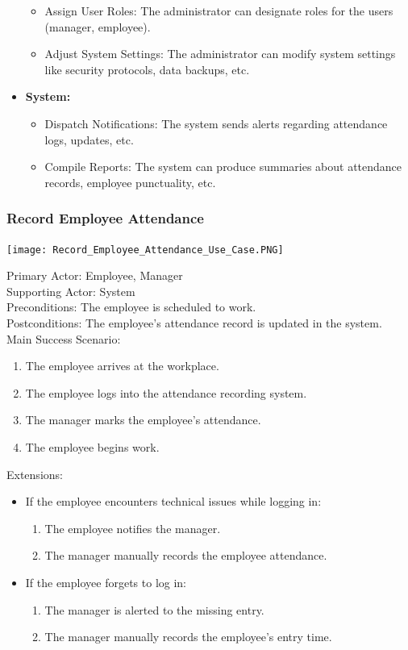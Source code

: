 \documentclass[a4paper, 12pt]{article}
\begin{document}
\begin{itemize}
\begin{itemize}
        \item Assign User Roles: The administrator can designate roles for the users (manager, employee).
        \item Adjust System Settings: The administrator can modify system settings like security protocols, data backups, etc.
    \end{itemize}
    \item \textbf{System:}
    \begin{itemize}
        \item Dispatch Notifications: The system sends alerts regarding attendance logs, updates, etc.
        \item Compile Reports: The system can produce summaries about attendance records, employee punctuality, etc.
    \end{itemize}
\end{itemize}

\subsubsection{Record Employee Attendance}
\begin{center}
\texttt{[image: Record\_Employee\_Attendance\_Use\_Case.PNG]}\par
\end{center}
Primary Actor: Employee, Manager\\
Supporting Actor: System\\
Preconditions: The employee is scheduled to work.\\
Postconditions: The employee's attendance record is updated in the system.\\
\newpage
Main Success Scenario:
\begin{enumerate}
    \item The employee arrives at the workplace.
    \item The employee logs into the attendance recording system.
    \item The manager marks the employee's attendance.
    \item The employee begins work.
\end{enumerate}
Extensions:
\begin{itemize}
    \item If the employee encounters technical issues while logging in:
    \begin{enumerate}
        \item The employee notifies the manager.
        \item The manager manually records the employee attendance.
    \end{enumerate}
    \item If the employee forgets to log in:
    \begin{enumerate}
        \item The manager is alerted to the missing entry.
        \item The manager manually records the employee's entry time.
    \end{enumerate}
\end{itemize}
\end{document}
